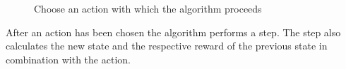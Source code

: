 \documentclass{article}
\begin{document}
	
	
	
	
	
	\begin{figure}
		\caption{Choose an action with which the algorithm proceeds}
		\label{fig:chooseAction}
		
	\end{figure}
	\newpage
	
	
	\noindent After an action has been chosen the algorithm performs a step. 
	The step also calculates the new state and the respective reward of the previous state in combination with the action.
	
	
	
	
	
\end{document}
